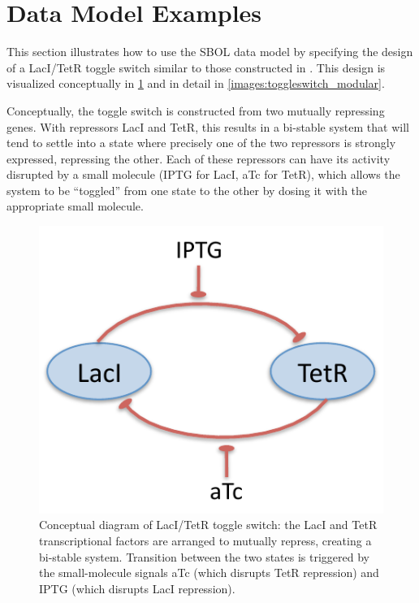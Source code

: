 \section{Data Model Examples}
\label{sec:examples}


This section illustrates how to use the SBOL data model by specifying the design of a LacI/TetR toggle switch similar to those constructed in \cite{Gardner2000}. This design is visualized conceptually in \ref{images:toggle} and in detail in \ref{images:toggleswitch_modular}. 

Conceptually, the toggle switch is constructed from two mutually repressing genes.  
With repressors LacI and TetR, this results in a bi-stable system that will tend to settle into a state where precisely one of the two repressors is strongly expressed, repressing the other.
Each of these repressors can have its activity disrupted by a small molecule (IPTG for LacI, aTc for TetR), which allows the system to be ``toggled'' from one state to the other by dosing it with the appropriate small molecule.

\begin{figure}[ht]
\begin{center}
\includegraphics[scale=1.0]{images/toggle-highlevel.pdf}
\caption[]{Conceptual diagram of LacI/TetR toggle switch: the LacI 
  and TetR transcriptional factors are arranged to mutually repress, 
  creating a bi-stable system.  Transition between the two states
  is triggered by the small-molecule signals aTc (which disrupts TetR
  repression) and IPTG (which disrupts LacI repression).}
\label{images:toggle}
\end{center}
\end{figure}

